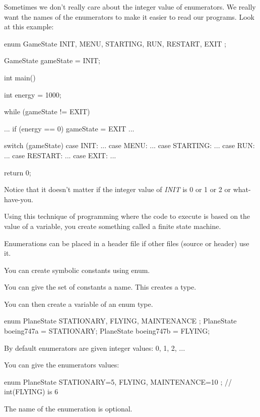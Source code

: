 

\newpage{}

Sometimes we don't really care about the integer value
of enumerators. We really want the names of the enumerators to make it
easier to read our programs. Look at this example:

\begin{consolethree}[escapeinside=||]
enum GameState
{
    INIT, MENU, STARTING, RUN, RESTART, EXIT
};

GameState gameState = INIT;

int main()
{
    int energy = 1000;

    while (gameState != EXIT)
    {
        ...
        if (energy == 0)
            gameState = EXIT
        ...

        switch (gameState)
        {
            case INIT: ...
            case MENU: ...
            case STARTING: ...
            case RUN: ...
            case RESTART: ...
            case EXIT: ...
        }
    }

    return 0;
}
\end{consolethree}

Notice that it doesn't matter if the integer value of
\textit{INIT} is 0 or 1 or 2 or what-have-you.

Using this technique of programming where the code to execute is based
on the value of a variable, you create something called a finite state
machine.




\newpage{}

Enumerations can be placed in a header file if other files (source or
header) use it.


\newpage{}

You can create symbolic constants using enum.

You can give the set of constants a name. This creates a type.

You can then create a variable of an enum type.

\begin{consolethree}[escapeinside=||]
enum PlaneState { STATIONARY, FLYING, MAINTENANCE };
PlaneState boeing747a = STATIONARY;
PlaneState boeing747b = FLYING;
\end{consolethree}

By default enumerators are given integer values: 0, 1, 2, ...

You can give the enumerators values:

\begin{consolethree}[escapeinside=||]
enum PlaneState
{
    STATIONARY=5, FLYING, MAINTENANCE=10
}; // int(FLYING) is 6
\end{consolethree}

The name of the enumeration is optional.

